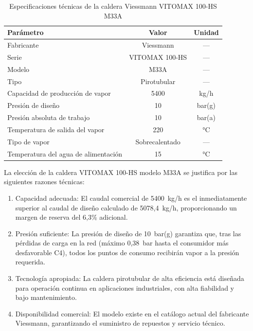\documentclass[12pt]{article}
\begin{document}
\begin{table}[H]
	\centering
	\caption{Especificaciones técnicas de la caldera Viessmann VITOMAX 100-HS M33A}
	\label{tab:especificaciones-caldera-vitomax}
	\begin{tabular}{lcc}
		\toprule
		\textbf{Parámetro}                   & \textbf{Valor} & \textbf{Unidad} \\
		\midrule
		Fabricante                           & Viessmann      & ---             \\
		Serie                                & VITOMAX 100-HS & ---             \\
		Modelo                               & M33A           & ---             \\
		Tipo                                 & Pirotubular    & ---             \\
		Capacidad de producción de vapor     & 5400           & kg/h            \\
		Presión de diseño                    & 10             & bar(g)          \\
		Presión absoluta de trabajo          & 10             & bar(a)          \\
		Temperatura de salida del vapor      & 220            & °C              \\
		Tipo de vapor                        & Sobrecalentado & ---             \\
		Temperatura del agua de alimentación & 15             & °C              \\
		\bottomrule
	\end{tabular}
\end{table}

La elección de la caldera VITOMAX 100-HS modelo M33A se justifica por las siguientes razones técnicas:

\begin{enumerate}[label=\arabic*., leftmargin=2em]
	\item Capacidad adecuada: El caudal comercial de 5400~kg/h es el inmediatamente superior al caudal de diseño calculado de 5078,4~kg/h, proporcionando un margen de reserva del 6,3\% adicional.
	\item Presión suficiente: La presión de diseño de 10~bar(g) garantiza que, tras las pérdidas de carga en la red (máximo 0,38~bar hasta el consumidor más desfavorable C4), todos los puntos de consumo recibirán vapor a la presión requerida.
	\item Tecnología apropiada: La caldera pirotubular de alta eficiencia está diseñada para operación continua en aplicaciones industriales, con alta fiabilidad y bajo mantenimiento.
	\item Disponibilidad comercial: El modelo existe en el catálogo actual del fabricante Viessmann, garantizando el suministro de repuestos y servicio técnico.
\end{enumerate}
\end{document}
